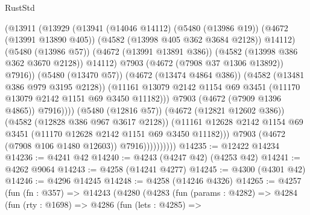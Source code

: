 \begin{lexlean}{RustStd}
\begin{coremodule}
{\begin{coremodule}
{{{{{{{{{{{{{{{{                                      (@13911
                                        (@13929
                                          (@13941
                                            (@14046 @14112)
                                            (@5480 (@13986 @19))
                                            (@4672 (@13991 @13890 @405))
                                            (@4582 (@13998 @405 @362 @3684 @2128))
                                            @14112)
                                          (@5480 (@13986 @57))
                                          (@4672 (@13991 @13891 @386))
                                          (@4582 (@13998 @386 @362 @3670 @2128))
                                          @14112)
                                        @7903
                                        (@4672 (@7908 @37 @1306 @13892))
                                        @7916))
                                    (@5480 (@13470 @57))
                                    (@4672 (@13474 @4864 @386))
                                    (@4582 (@13481 @386 @979 @3195 @2128))
                                    (@11161
                                      @13079
                                      @2142
                                      @1154
                                      @69
                                      @3451
                                      (@11170 @13079 @2142 @1151 @69 @3450 @11182)))
                                  @7903
                                  (@4672 (@7909 @1396 @4865))
                                  @7916))))
                          (@5480 (@12816 @57))
                          (@4672 (@12821 @12602 @386))
                          (@4582 (@12828 @386 @967 @3617 @2128))
                          (@11161
                            @12628
                            @2142
                            @1154
                            @69
                            @3451
                            (@11170 @12628 @2142 @1151 @69 @3450 @11182)))
                        @7903
                        (@4672 (@7908 @106 @1480 @12603))
                        @7916))))))))))
@14235 := @12422 @14234
@14236 := @4241 @42
@14240 := @4243 (@4247 @42) (@4253 @42)
@14241 := @4262 @9064
@14243 := @4258 (@14241 @4277)
@14245 := @4300 (@4301 @42)
@14246 := @4296 @14245
@14248 := @4258 (@14246 @4326)
@14265 := @4257
    (fun (fn : @357) =>
    @14243
      (@4280
        (@4283
          (fun (params : @4282) =>
          @4284
            (fun (rty : @1698) =>
            @4286
              (fun (lets : @4285) =>
}}}}}}}}}}}}}}}}
\end{coremodule}}
\end{coremodule}
\end{lexlean}
